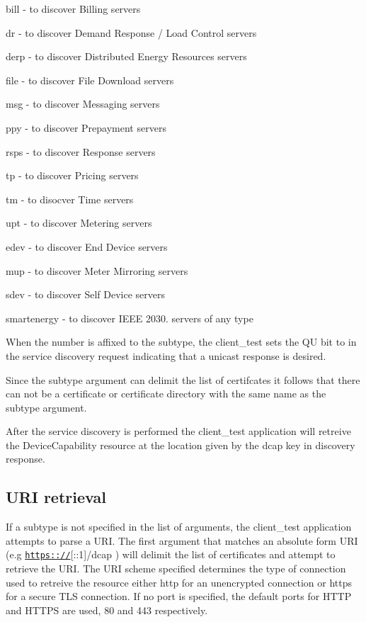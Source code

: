 \begin{DoxyItemize}
\item {\ttfamily bill} -\/ to discover Billing servers
\item {\ttfamily dr} -\/ to discover Demand Response / Load Control servers
\item {\ttfamily derp} -\/ to discover Distributed Energy Resources servers
\item {\ttfamily file} -\/ to discover File Download servers
\item {\ttfamily msg} -\/ to discover Messaging servers
\item {\ttfamily ppy} -\/ to discover Prepayment servers
\item {\ttfamily rsps} -\/ to discover Response servers
\item {\ttfamily tp} -\/ to discover Pricing servers
\item {\ttfamily tm} -\/ to disocver Time servers
\item {\ttfamily upt} -\/ to discover Metering servers
\item {\ttfamily edev} -\/ to discover End Device servers
\item {\ttfamily mup} -\/ to discover Meter Mirroring servers
\item {\ttfamily sdev} -\/ to discover Self Device servers
\item {\ttfamily smartenergy} -\/ to discover I\+E\+EE 2030. servers of any type
\end{DoxyItemize}

When the number {} is affixed to the {\ttfamily subtype}, the {\ttfamily client\+\_\+test} sets the {\ttfamily QU} bit to {} in the service discovery request indicating that a unicast response is desired.

Since the {\ttfamily subtype} argument can delimit the list of certifcates it follows that there can not be a certificate or certificate directory with the same name as the {\ttfamily subtype} argument.

After the service discovery is performed the {\ttfamily client\+\_\+test} application will retreive the Device\+Capability resource at the location given by the {\ttfamily dcap} key in discovery response.

\subsection*{U\+RI retrieval }

If a {\ttfamily subtype} is not specified in the list of arguments, the {\ttfamily client\+\_\+test} application attempts to parse a U\+RI. The first argument that matches an absolute form U\+RI (e.\+g \href{https:://}{\tt https\+:://}\mbox{[}\+:\+:1\mbox{]}/dcap ) will delimit the list of certificates and attempt to retrieve the U\+RI. The U\+RI scheme specified determines the type of connection used to retreive the resource either {\ttfamily http} for an unencrypted connection or {\ttfamily https} for a secure T\+LS connection. If no port is specified, the default ports for H\+T\+TP and H\+T\+T\+PS are used, 80 and 443 respectively.

